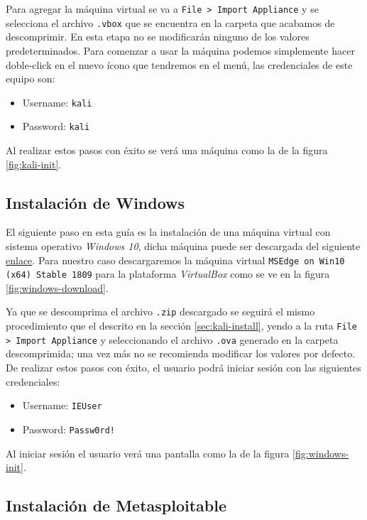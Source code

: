 \documentclass{article}
\begin{document}
            Para agregar la máquina virtual se va a \texttt{File > Import Appliance} y se selecciona el archivo \texttt{.vbox} que se encuentra en la carpeta que acabamos de descomprimir. En esta etapa no se modificarán ninguno de los valores predeterminados. Para comenzar a usar la máquina podemos simplemente hacer doble-click en el nuevo ícono que tendremos en el menú, las credenciales de este equipo son:
            \begin{itemize}
                \item Username: \texttt{kali}
                \item Password: \texttt{kali}
            \end{itemize}

            Al realizar estos pasos con éxito se verá una máquina como la de la figura \ref{fig:kali-init}.

        \subsection{Instalación de Windows}

            El siguiente paso en esta guía es la instalación de una máquina virtual con sistema operativo \emph{Windows 10}, dicha máquina puede ser descargada del siguiente \href{https://developer.microsoft.com/en-us/microsoft-edge/tools/vms/}{enlace}. Para nuestro caso descargaremos la máquina virtual \texttt{MSEdge on Win10 (x64) Stable 1809} para la plataforma \emph{VirtualBox} como se ve en la figura \ref{fig:windows-download}.

            Ya que se descomprima el archivo \texttt{.zip} descargado se seguirá el mismo procedimiento que el descrito en la sección \ref{sec:kali-install}, yendo a la ruta \texttt{File > Import Appliance} y seleccionando el archivo \texttt{.ova} generado en la carpeta descomprimida; una vez más no se recomienda modificar los valores por defecto. De realizar estos pasos con éxito, el usuario podrá iniciar sesión con las siguientes credenciales:
            \begin{itemize}
                \item Username: \texttt{IEUser}
                \item Password: \texttt{Passw0rd!}
            \end{itemize}

            Al iniciar sesión el usuario verá una pantalla como la de la figura \ref{fig:windows-init}.

        \subsection{Instalación de Metasploitable}
\end{document}
